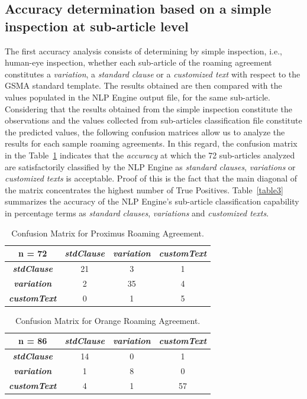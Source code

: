 \documentclass[conference]{style/IEEEtran}
\begin{document}
\subsection{Accuracy determination based on a simple inspection at sub-article level}
The first accuracy analysis consists of determining by simple inspection, i.e., human-eye inspection, whether each sub-article of the roaming agreement constitutes a \textit{variation}, a \textit{standard clause} or a \textit{customized text} with respect to the GSMA standard template. The results obtained are then compared with the values populated in the NLP Engine output file, for the same sub-article. Considering that the results obtained from the simple inspection constitute the observations and the values collected from sub-articles classification file constitute the predicted values, the following confusion matrices allow us to analyze the results for each sample roaming agreements. In this regard, the confusion matrix in the Table~\ref{table1} indicates that the \textit{accuracy} at which the 72 sub-articles analyzed are satisfactorily classified by the NLP Engine as \textit{standard clauses}, \textit{variations} or \textit{customized texts} is acceptable. Proof of this is the fact that the main diagonal of the matrix concentrates the highest number of True Positives. Table~\ref{table3} summarizes the accuracy of the NLP Engine's sub-article classification capability in percentage terms as \textit{standard clauses}, \textit{variations} and \textit{customized texts}.

\begin{table}[htbp]
\caption{Confusion Matrix for Proximus Roaming Agreement.}
\begin{center}
\begin{tabular}{|c|c|c|c|}
\hline
\textbf{n = 72} & \textbf{\textit{stdClause}}& \textbf{\textit{variation}}& \textbf{\textit{customText}} \\
\hline
\textbf{\textit{stdClause}}& 21 & 3 & 1 \\
\hline
\textbf{\textit{variation}}& 2 & 35 & 4 \\
\hline
\textbf{\textit{customText}}& 0 & 1 & 5 \\
\hline
\end{tabular}
\label{table1}
\end{center}
\end{table}

\begin{table}[htbp]
\caption{Confusion Matrix for Orange Roaming Agreement.}
\begin{center}
\begin{tabular}{|c|c|c|c|}
\hline
\textbf{n = 86} & \textbf{\textit{stdClause}}& \textbf{\textit{variation}}& \textbf{\textit{customText}} \\
\hline
\textbf{\textit{stdClause}}& 14 & 0 & 1 \\
\hline
\textbf{\textit{variation}}& 1 & 8 & 0 \\
\hline
\textbf{\textit{customText}}& 4 & 1 & 57 \\
\hline
\end{tabular}
\label{table2}
\end{center}
\end{table}
\end{document}
